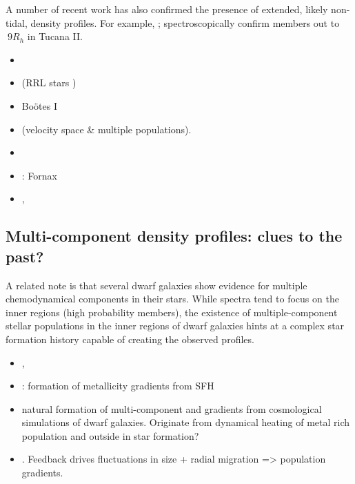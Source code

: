 A number of recent work has also confirmed the presence of extended,
likely non-tidal, density profiles. For example, \citet{chiti+2021};
\citet{chiti+2023} spectroscopically confirm members out to \(~9 R_h\)
in Tucana II.

\begin{itemize}
\tightlist
\item
  \citet{revaz+jablonka2018}
\item
  \citet{tau+vivas+martinez-vazquez2024} (RRL stars )
\item
  \citet{roderick+2016} Boötes I
\item
  \citet{mcconnachie+penarrubia+navarro2007} (velocity space \& multiple
  populations).
\item
  \citet{cicuendez+battaglia2018}
\item
  \citet{delpino+aparicio+hidalgo2015}: Fornax
\item
  \citet{delpino+2017}, \citet{delpino+2017a}
\end{itemize}

\subsection{Multi-component density profiles: clues to the
past?}\label{multi-component-density-profiles-clues-to-the-past}

A related note is that several dwarf galaxies show evidence for multiple
chemodynamical components in their stars. While spectra tend to focus on
the inner regions (high probability members), the existence of
multiple-component stellar populations in the inner regions of dwarf
galaxies hints at a complex star formation history capable of creating
the observed profiles.

\begin{itemize}
\item
  \citet{benitez-llambay+2016}, \citet{benitez-llambay+2015}
\item
  \citet{mercado+2021}: formation of metallicity gradients from SFH
\item
  \citet{revaz+jablonka2018} natural formation of multi-component and
  gradients from cosmological simulations of dwarf galaxies. Originate
  from dynamical heating of metal rich population and outside in star
  formation?
\item
  \citet{el-badry+2016}. Feedback drives fluctuations in size + radial
  migration =\textgreater{} population gradients.
\end{itemize}

